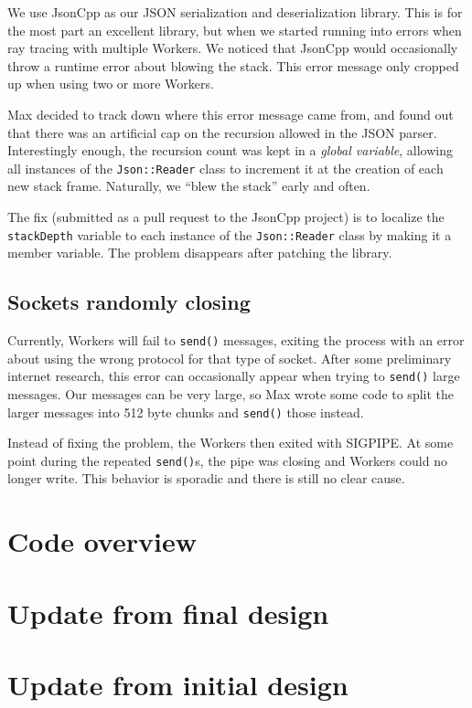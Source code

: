 \documentclass[letterpaper,twocolumn,10pt]{article}
\begin{document}
We use JsonCpp as our JSON serialization and deserialization library. This is
for the most part an excellent library, but when we started running into errors
when ray tracing with multiple Workers. We noticed that JsonCpp would
occasionally throw a runtime error about blowing the stack. This error message
only cropped up when using two or more Workers.

Max decided to track down where this error message came from, and found out that
there was an artificial cap on the recursion allowed in the JSON
parser. Interestingly enough, the recursion count was kept in a \textit{global
  variable}, allowing all instances of the \verb|Json::Reader| class to
increment it at the creation of each new stack frame. Naturally, we ``blew the
stack'' early and often.

The fix (submitted as a pull request to the JsonCpp project) is to localize the
\verb|stackDepth| variable to each instance of the \verb|Json::Reader| class by
making it a member variable. The problem disappears after patching the library.

\subsection{Sockets randomly closing}

Currently, Workers will fail to \verb|send()| messages, exiting the process with
an error about using the wrong protocol for that type of socket. After some
preliminary internet research, this error can occasionally appear when trying to
\verb|send()| large messages. Our messages can be very large, so Max wrote some
code to split the larger messages into 512 byte chunks and \verb|send()| those
instead.

Instead of fixing the problem, the Workers then exited with SIGPIPE. At some
point during the repeated \verb|send()|s, the pipe was closing and Workers could
no longer write. This behavior is sporadic and there is still no clear cause.

\section{Code overview}


\section{Update from final design}



\section{Update from initial design}


\end{document}
